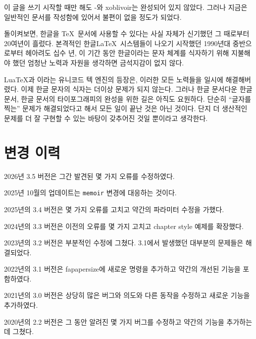 \documentclass[
	12pt,
	a4paper,
	kosection,
	footnote,
	microtype,
	figtabcapt,
]{oblivoir}
\newcommand\xobclass{x\-ob\-liv\-oir\oblivoirallowbreak}
\def\xetexko{\XeTeX-\ko}
\begin{document}
이 글을 쓰기 시작할 때만 해도 \xetexko{}와 \xobclass{}는
완성되어 있지 않았다. 그러나 지금은 일반적인 문서를 작성함에 있어서
불편이 없을 정도가 되었다.

\bigskip

돌이켜보면, 한글을 \TeX\ 문서에 사용할 수 있다는 사실 자체가
신기했던 그 때로부터 20여년이 흘렀다. 본격적인 한글\LaTeX\ 시스템들이
나오기 시작했던 1990년대 중반으로부터 헤아려도 십수 년,
이 기간 동안 한글이라는 문자 체계를 식자하기 위해 지불해야 했던
엄청난 노력과 자원을 생각하면 금석지감이 없지 않다.

Lua\TeX 과 \XeTeX 이라는 유니코드 텍 엔진의 등장은, 이러한 모든
노력들을 일시에 해결해버렸다. 이제 한글 문자의 식자는 더이상
문제가 되지 않는다.
그러나 한글 문서다운 한글 문서, 한글 문서의 타이포그래피의 완성을
위한 길은 아직도 요원하다. 단순히 “글자를 찍는” 문제가 해결되었다고
해서 모든 일이 끝난 것은 아닌 것이다. 단지 더 생산적인 문제를
더 잘 구현할 수 있는 바탕이 갖추어진 것일 뿐이라고 생각한다.


\section{변경 이력}

\noindent
2026년 3.5 버전은 그간 발견된 몇 가지 오류를 수정하였다.

\noindent
2025년 10월의 업데이트는 \texttt{memoir} 변경에 대응하는 것이다.

\noindent
2025년의 3.4 버전은 몇 가지 오류를 고치고 약간의 파라미터 수정을 가했다.

\noindent
2024년의 3.3 버전은 이전의 오류를 몇 가지 고치고 chapter style 예제를 확장했다.

\noindent
2023년의 3.2 버전은 부분적인 수정에 그쳤다. 3.1에서 발생했던 대부분의
문제들은 해결되었다.

\noindent
2022년의 3.1 버전은 fapapersize에 새로운 명령을 추가하고 약간의
개선된 기능을 포함하였다. 

\noindent
2021년의 3.0 버전은 상당히 많은 버그와 의도와 다른 동작을 수정하고 새로운 
기능을 추가하였다.

\noindent
2020년의 2.2 버전은 그 동안 알려진 몇 가지 버그를 수정하고 약간의 기능을
추가하는 데 그쳤다.


\end{document}
